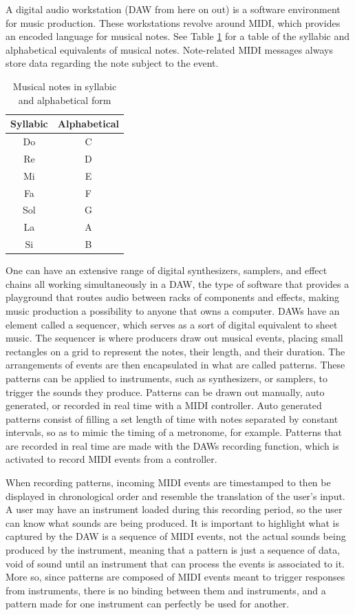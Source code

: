 \documentclass[12pt, a4paper, hidelinks]{article}
\begin{document}
 	A digital audio workstation (DAW from here on out) is a software environment for music production. These workstations revolve around MIDI, which provides an encoded language for musical notes. See Table \ref{table:notes} for a table of the syllabic and alphabetical equivalents of musical notes. Note-related MIDI messages always store data regarding the note subject to the event. 
 	\par
	\begin{table}[h]
		\centering
		\begin{tabular}{c c}
			Syllabic & Alphabetical \tabularnewline
			\midrule
			Do  & C \tabularnewline
			Re  & D \tabularnewline
			Mi  & E \tabularnewline
			Fa  & F \tabularnewline
			Sol & G \tabularnewline
			La  & A \tabularnewline
			Si  & B \tabularnewline
		\end{tabular}
		\caption{Musical notes in syllabic and alphabetical form}
		\label{table:notes}
	\end{table} 
	One can have an extensive range of digital synthesizers, samplers, and effect chains all working simultaneously in a DAW, the type of software that provides a playground that routes audio between racks of components and effects, making music production a possibility to anyone that owns a computer. DAWs have an element called a sequencer, which serves as a sort of digital equivalent to sheet music. The sequencer is where producers draw out musical events, placing small rectangles on a grid to represent the notes, their length, and their duration. The arrangements of events are then encapsulated in what are called patterns. These patterns can be applied to instruments, such as synthesizers, or samplers, to trigger the sounds they produce. Patterns can be drawn out manually, auto generated, or recorded in real time with a MIDI controller. Auto generated patterns consist of filling a set length of time with notes separated by constant intervals, so as to mimic the timing of a metronome, for example. Patterns that are recorded in real time are made with the DAWs recording function, which is activated to record MIDI events from a controller. \par 

	When recording patterns, incoming MIDI events are timestamped to then be displayed in chronological order and resemble the translation of the user's input. A user may have an instrument loaded during this recording period, so the user can know what sounds are being produced. It is important to highlight what is captured by the DAW is a sequence of MIDI events, not the actual sounds being produced by the instrument, meaning that a pattern is just a sequence of data, void of sound until an instrument that can process the events is associated to it. More so, since patterns are composed of MIDI events meant to trigger responses from instruments, there is no binding between them and instruments, and a pattern made for one instrument can perfectly be used for another. \par 
	
\end{document}
